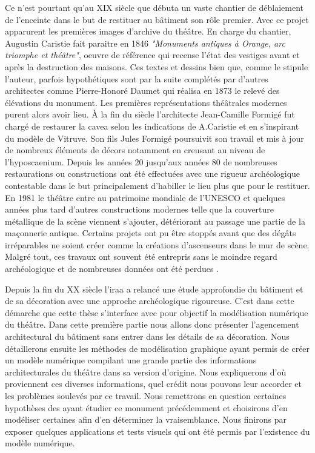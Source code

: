 			 Ce n'est pourtant qu'au XIX siècle que débuta un vaste chantier de déblaiement de l'enceinte dans le but de restituer au bâtiment son rôle premier. Avec ce projet apparurent les premières images d'archive du théâtre. En charge du chantier, Augustin Caristie fait paraitre en 1846 \textit{"Monuments antiques à Orange, arc triomphe et théâtre"}, oeuvre de référence qui recense l'état des vestiges avant et après la destruction des maisons. Ces textes et dessins bien que, comme le stipule l'auteur, parfois hypothétiques sont par la suite complétés par d'autres architectes comme Pierre-Honoré Daumet qui réalisa en 1873 le relevé des élévations du monument. Les premières représentations théâtrales modernes purent alors avoir lieu. \`{A} la fin du siècle l'architecte Jean-Camille Formigé fut chargé de restaurer la \gls{cavea} selon les indications de A.Caristie et en s'inspirant du modèle de Vitruve. Son fils Jules Formigé poursuivit son travail et mis à jour de nombreux éléments de décors notamment en creusant au niveau de l'\gls{hyposcaenium}. Depuis les années 20 jusqu'aux années 80 de nombreuses restaurations ou constructions ont été effectuées avec une rigueur archéologique contestable dans le but principalement d'habiller le lieu plus que pour le restituer. En 1981 le théâtre entre au patrimoine mondiale de l'UNESCO et quelques années plus tard d'autres constructions modernes telle que la couverture métallique de la scène viennent s'ajouter, détériorant au passage une partie de la maçonnerie antique. Certains projets ont pu être stoppés avant que des dégâts irréparables ne soient créer comme la créations d'ascenseurs dans le mur de scène. Malgré tout, ces travaux ont souvent été entrepris sans le moindre regard archéologique et de nombreuses données ont été perdues \citep{carteArcheo}.
			 
			 Depuis la fin du XX siècle l'\gls{iraa} a relancé une étude approfondie du bâtiment et de sa décoration avec une approche archéologique rigoureuse. C'est dans cette démarche que cette thèse s'interface avec pour objectif la modélisation numérique du théâtre. Dans cette première partie nous allons donc présenter l'agencement architectural du bâtiment sans entrer dans les détails de sa décoration. Nous détaillerons ensuite les méthodes de modélisation graphique ayant permis de créer un modèle numérique compilant une grande partie des informations architecturales du théâtre dans sa version d'origine. Nous expliquerons d'où proviennent ces diverses informations, quel crédit nous pouvons leur accorder et les problèmes soulevés par ce travail. Nous remettrons en question certaines hypothèses des ayant étudier ce monument précédemment et choisirons d'en modéliser certaines afin d'en déterminer la vraisemblance. Nous finirons par exposer quelques applications et tests visuels qui ont été permis par l'existence du modèle numérique.
			 

